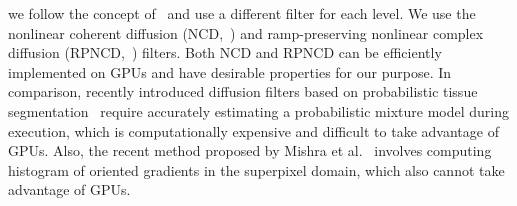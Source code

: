 we follow the concept of~\cite{kang_new_2016} and use a different filter for each level.
We use the nonlinear coherent diffusion (NCD,~\cite{abd-elmoniem_realtime_2002}) and ramp-preserving nonlinear complex diffusion (RPNCD,~\cite{gilboa_image_2004}) filters.
Both NCD and RPNCD can be efficiently implemented on GPUs and have desirable properties for our purpose.
In comparison, recently introduced diffusion filters based on probabilistic tissue segmentation~\cite{vegas-sanchez-ferrero_probabilisticdriven_2010, ramos-llorden_anisotropic_2015} require accurately estimating a probabilistic mixture model during execution, which is computationally expensive and difficult to take advantage of GPUs.
Also, the recent method proposed by Mishra et al.~\cite{mishra_edge_2018} involves computing histogram of oriented gradients in the superpixel domain, which also cannot take advantage of GPUs.
%
